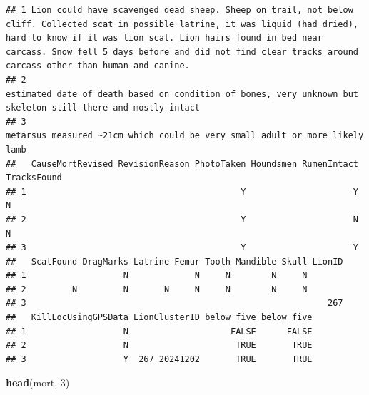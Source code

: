 \documentclass[
]{book}
\newenvironment{Shaded}{\begin{snugshade}}{\end{snugshade}}
\newcommand{\DecValTok}[1]{\textcolor[rgb]{0.00,0.00,0.81}{#1}}
\newcommand{\FunctionTok}[1]{\textcolor[rgb]{0.13,0.29,0.53}{\textbf{#1}}}
\newcommand{\NormalTok}[1]{#1}
\begin{document}
\begin{verbatim}
## 1 Lion could have scavenged dead sheep. Sheep on trail, not below cliff. Collected scat in possible latrine, it was liquid (had dried), hard to know if it was lion scat. Lion hairs found in bed near carcass. Snow fell 5 days before and did not find clear tracks around carcass other than human and canine.
## 2                                                                                                                                                                                                    estimated date of death based on condition of bones, very unknown but skeleton still there and mostly intact
## 3                                                                                                                                                                                                                                     metarsus measured ~21cm which could be very small adult or more likely lamb
##   CauseMortRevised RevisionReason PhotoTaken Houndsmen RumenIntact TracksFound
## 1                                          Y                     Y           N
## 2                                          Y                     N           N
## 3                                          Y                     Y            
##   ScatFound DragMarks Latrine Femur Tooth Mandible Skull LionID
## 1                   N             N     N        N     N       
## 2         N         N       N     N     N        N     N       
## 3                                                           267
##   KillLocUsingGPSData LionClusterID below_five below_five
## 1                   N                    FALSE      FALSE
## 2                   N                     TRUE       TRUE
## 3                   Y  267_20241202       TRUE       TRUE
\end{verbatim}

\begin{Shaded}
\begin{Highlighting}[]
\FunctionTok{head}\NormalTok{(mort, }\DecValTok{3}\NormalTok{)}
\end{Highlighting}
\end{Shaded}
\end{document}
